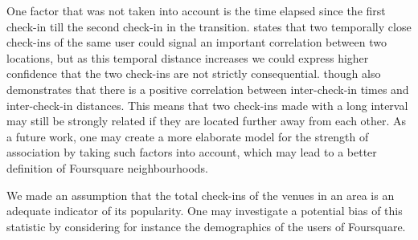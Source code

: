 One factor that was not taken into account is the time elapsed since the first check-in till the second check-in in the transition. \cite{noulas2011empirical} states that two temporally close check-ins of the same user could signal an important correlation between
two locations, but as this temporal distance increases we could express higher confidence that the two check-ins are not strictly consequential. \cite{noulas2011empirical} though also demonstrates that there is a positive correlation between inter-check-in times and inter-check-in distances. This means that two check-ins made with a long interval may still be strongly related if they are located further away from each other. As a future work, one may create a more elaborate model for the strength of association by taking such factors into account, which may lead to a better definition of Foursquare neighbourhoods.

We made an assumption that the total check-ins of the venues in an area is an adequate indicator of its popularity. One may investigate a potential bias of this statistic by considering for instance the demographics of the users of Foursquare.